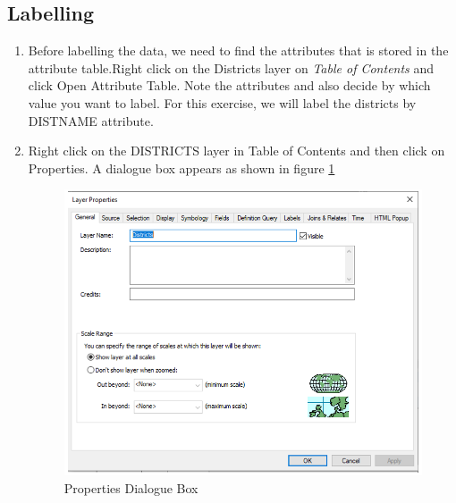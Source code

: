 \subsection{Labelling}
\begin{enumerate}
\item{Before labelling the data, we need to find the attributes that is stored in the attribute table.Right click on the Districts layer on \emph{Table of Contents} and click Open Attribute Table. Note the attributes and also decide by which value you want to label. For this exercise, we will label the districts by DIST\textunderscore NAME attribute.}
\item{Right click on the DISTRICTS layer in Table of Contents and then click on Properties. A dialogue box appears as shown in figure \ref{fig:properties}} 
	\begin{figure}
	\centering
	\label{fig:properties}
	\includegraphics[scale=0.5]{images/properties}
	\caption{Properties Dialogue Box}
	\end{figure}
 

\end{enumerate}
